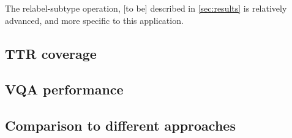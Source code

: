 The relabel-subtype operation, [to be] described in \autoref{sec:results} is relatively advanced, and more specific to this application.



\subsection{TTR coverage}



\subsection{VQA performance}



\subsection{Comparison to different approaches}
